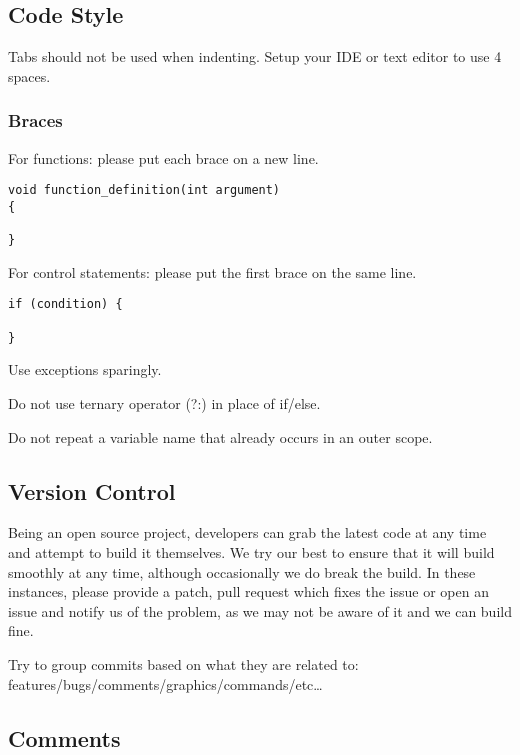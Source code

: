\hypertarget{code-style}{%
\subsection{Code Style}\label{code-style}}

Tabs should not be used when indenting. Setup your IDE or text editor to
use 4 spaces.

\hypertarget{braces}{%
\subsubsection{Braces}\label{braces}}

For functions: please put each brace on a new line.

\begin{verbatim}
void function_definition(int argument)
{

}
\end{verbatim}

For control statements: please put the first brace on the same line.

\begin{verbatim}
if (condition) {

}
\end{verbatim}

Use exceptions sparingly.

Do not use ternary operator (?:) in place of if/else.

Do not repeat a variable name that already occurs in an outer scope.

\hypertarget{version-control}{%
\subsection{Version Control}\label{version-control}}

Being an open source project, developers can grab the latest code at any
time and attempt to build it themselves. We try our best to ensure that
it will build smoothly at any time, although occasionally we do break
the build. In these instances, please provide a patch, pull request
which fixes the issue or open an issue and notify us of the problem, as
we may not be aware of it and we can build fine.

Try to group commits based on what they are related to:
features/bugs/comments/graphics/commands/etc\ldots{}

\hypertarget{comments}{%
\subsection{Comments}\label{comments}}

